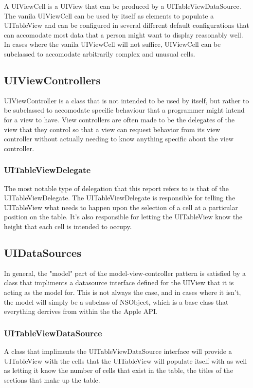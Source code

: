 \documentclass[se]{uw-wkrpt}
\begin{document}
A UIViewCell is a UIView that can be produced by a UITableViewDataSource.
The vanila UIViewCell can be used by itself as elements to populate a
UITableView and can be configured in several different default configurations
that can accomodate most data that a person might want to display reasonably
well. In cases where the vanila UIViewCell will not suffice, UIViewCell can
be subclassed to accomodate arbitrarily complex and unusual cells.

\subsection{UIViewControllers}

UIViewController is a class that is not intended to be used by itself, 
but rather to be subclassed to accomodate specific behaviour that
a programmer might intend for a view to have. View controllers are
often made to be the delegates of the view that they control so that
a view can request behavior from its view controller without actually
needing to know anything specific about the view controller. 

\subsubsection{UITableViewDelegate}

The most notable type of delegation that this report refers to is
that of the UITableViewDelegate. The UITableViewDelegate is responsible
for telling the UITableView what needs to happen upon the selection of
a cell at a particular position on the table. It's also responsible for 
letting the UITableView know the height that each cell is intended to
occupy.

\subsection{UIDataSources}

In general, the "model" part of the model-view-controller pattern is 
satisfied by a class that impliments a datasource interface defined for
the UIView that it is acting as the model for. This is not always
the case, and in cases where it isn't, the model will simply be a 
subclass of NSObject, which is a base class that everything derrives from
within the the Apple API.

\subsubsection{UITableViewDataSource}

A class that impliments the UITableViewDataSource interface will provide
a UITableView with the cells that the UITableView will populate itself with
as well as letting it know the number of cells that exist in the table,
the titles of the sections that make up the table.
\end{document}
